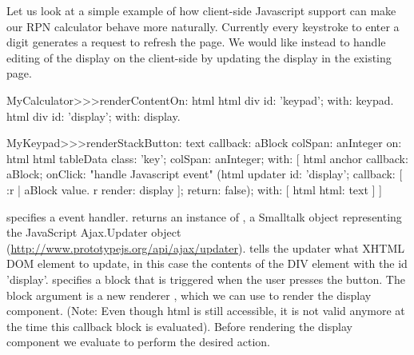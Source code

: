 \documentclass[a4paper,10pt,twoside]{book}
\begin{document}
Let us look at a simple example of how client-side Javascript support can make our RPN calculator behave more naturally.
Currently every keystroke to enter a digit generates a request to refresh the page.
We would like instead to handle editing of the display on the client-side by updating the display in the existing page.


\begin{code}{}
MyCalculator>>>renderContentOn: html
	html div id: 'keypad'; with: keypad.
	html div id: 'display'; with: display.	
\end{code}
				

\begin{code}{}
MyKeypad>>>renderStackButton: text callback: aBlock colSpan: anInteger on: html 
	html tableData
		class: 'key';
		colSpan: anInteger;
		with: [
			html anchor
				callback: aBlock;
				onClick:				"handle Javascript event"
					(html updater
						id: 'display';
						callback: [ :r |
							aBlock value.
							r render: display ];
						return: false);
				with: [ html html: text ] ]
\end{code}

 specifies a  event handler.
 returns an instance of , a Smalltalk object representing the JavaScript Ajax.Updater object (\url{http://www.prototypejs.org/api/ajax/updater}).
 tells the updater what XHTML DOM element to update, in this case the contents of the DIV element with the id 'display'.
 specifies a block that is triggered  when the user presses the button.
The block argument is a new renderer , which we can use to render the display component.
(Note: Even though html is still accessible, it is not valid anymore at the time this callback block is evaluated).
Before rendering the display component we evaluate  to perform the desired action.
\end{document}
